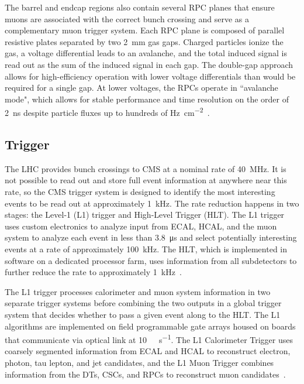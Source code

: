 The barrel and endcap regions also contain several RPC planes that ensure muons are associated with the correct bunch crossing and serve as a complementary muon trigger system. Each RPC plane is composed of parallel resistive plates separated by two \SI{2}{\mm} gas gaps. Charged particles ionize the gas, a voltage differential leads to an avalanche, and the total induced signal is read out as the sum of the induced signal in each gap. The double-gap approach allows for high-efficiency operation with lower voltage differentials than would be required for a single gap. At lower voltages, the RPCs operate in ``avalanche mode", which allows for stable performance and time resolution on the order of \SI{2}{\ns} despite particle fluxes up to hundreds of \si{\Hz\per\cm\tothe{2}}~\cite{cms_experiment, pdg_2020, rpc_run2}.

\subsection{Trigger}
\label{trigger}
The LHC provides bunch crossings to CMS at a nominal rate of \SI{40}{\MHz}. It is not possible to read out and store full event information at anywhere near this rate, so the CMS trigger system is designed to identify the most interesting events to be read out at approximately \SI{1}{\kHz}. The rate reduction happens in two stages: the Level-1 (L1) trigger and High-Level Trigger (HLT). The L1 trigger uses custom electronics to analyze input from ECAL, HCAL, and the muon system to analyze each event in less than \SI{3.8}{\us} and select potentially interesting events at a rate of approximately \SI{100}{\kHz}. The HLT, which is implemented in software on a dedicated processor farm, uses information from all subdetectors to further reduce the rate to approximately \SI{1}{\kHz}~\cite{cms_experiment, trigger_run2}.

The L1 trigger processes calorimeter and muon system information in two separate trigger systems before combining the two outputs in a global trigger system that decides whether to pass a given event along to the HLT. The L1 algorithms are implemented on field programmable gate arrays housed on boards that communicate via optical link at \SI{10}{\giga\byte\per\s}. The L1 Calorimeter Trigger uses coarsely segmented information from ECAL and HCAL to reconstruct electron, photon, tau lepton, and jet candidates, and the L1 Muon Trigger combines information from the DTs, CSCs, and RPCs to reconstruct muon candidates~\cite{cms_l1_upgrade}.

